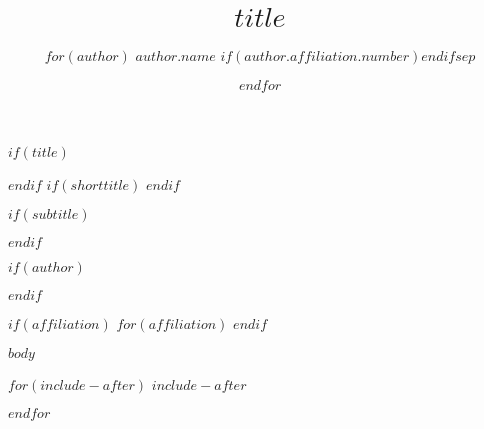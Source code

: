 \documentclass{svproc}
\begin{document}
\mainmatter

$if(title)$
\title{$title$}
$endif$
$if(shorttitle)$
$endif$

$if(subtitle)$
\providecommand{\subtitle}[1]{}
\subtitle{$subtitle$}
$endif$

$if(author)$
\author{$for(author)$ $author.name$ $if(author.affiliation.number)$$endif$$sep$ \and $endfor$}
$endif$

$if(affiliation)$
$for(affiliation)$
$endif$

\maketitle

$body$



$for(include-after)$
$include-after$

$endfor$
\end{document}
